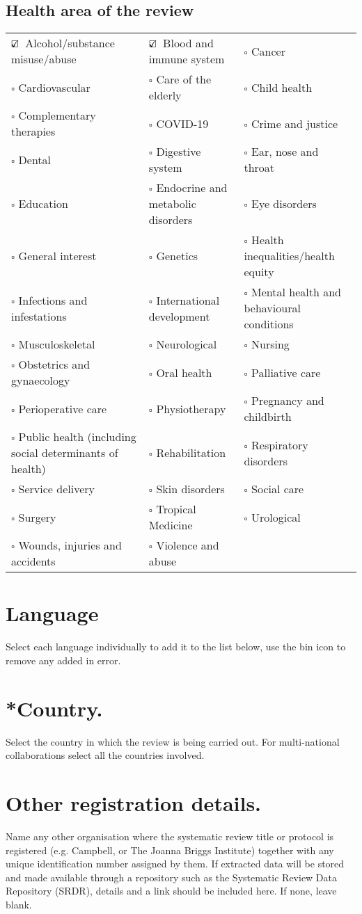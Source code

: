 \documentclass[11pt,letterpaper]{article}
\newcommand*{\checkedbox}{$\text{\rlap{$\checkmark$}}\square $\ }%
\newcommand{\dataitem}[2]{
	\section{#1}
	\textcolor{codegray}{#2} \\
}
\begin{document}
\subsection*{Health area of the review}
\begin{tabular}{ p{5.5 cm}p{5.5cm} p{5.5cm}}
	\checkedbox Alcohol/substance misuse/abuse & \checkedbox Blood and immune system &$\square$ Cancer\\
	$\square$ Cardiovascular &$\square$ Care of the elderly &$\square$ Child health \\
	$\square$ Complementary therapies &$\square$ COVID-19 &$\square$ Crime and justice \\
	$\square$  Dental &$\square$ Digestive system &$\square$  Ear, nose and throat\\
	$\square$ Education &$\square$ Endocrine and metabolic disorders&$\square$ Eye disorders \\
	$\square$ General interest &$\square$ Genetics &$\square$ Health inequalities/health equity\\
	$\square$ Infections and infestations &$\square$ International development&$\square$ Mental health and behavioural conditions\\
	$\square$  Musculoskeletal&$\square$ Neurological&$\square$ Nursing \\
	$\square$  Obstetrics and gynaecology &$\square$ Oral health&$\square$ Palliative care \\
	$\square$ Perioperative care&$\square$ Physiotherapy&$\square$ Pregnancy and childbirth\\			
	$\square$ Public health (including social determinants of health) &$\square$ Rehabilitation&$\square$ Respiratory disorders\\			
	$\square$ Service delivery&$\square$ Skin disorders&$\square$ Social care\\			
	$\square$ Surgery&$\square$ Tropical Medicine&$\square$ Urological\\			
	$\square$ Wounds, injuries and accidents&$\square$ Violence and abuse& 
\end{tabular}


\dataitem{Language}{Select each language individually to add it to the list below, use the bin icon to remove any added in error.}

\dataitem{*Country.}{Select the country in which the review is being carried out. For multi-national collaborations select all the countries involved.}		


\dataitem{Other registration details.}{Name any other organisation where the systematic review title or protocol is registered (e.g. Campbell, or The Joanna Briggs Institute) together with any unique identification number assigned by them. If extracted data will be stored and made available through a repository such as the Systematic Review Data Repository (SRDR), details and a link should be included here. If none, leave blank.}
\end{document}
